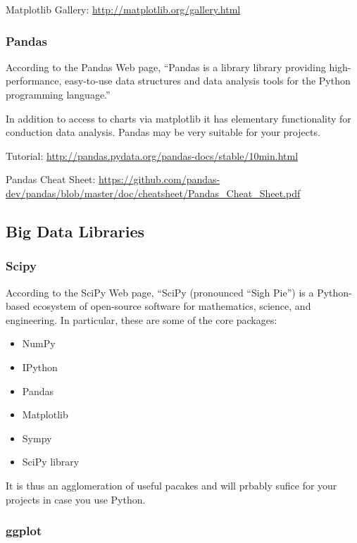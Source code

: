 Matplotlib Gallery: \url{http://matplotlib.org/gallery.html}

\subsubsection{Pandas}\label{pandas}


According to the Pandas Web page, ``Pandas is a library library
providing high-performance, easy-to-use data structures and data
analysis tools for the Python programming language.''

In addition to access to charts via matplotlib it has elementary
functionality for conduction data analysis. Pandas may be very suitable
for your projects.

Tutorial: \url{http://pandas.pydata.org/pandas-docs/stable/10min.html}

Pandas Cheat Sheet:
\url{https://github.com/pandas-dev/pandas/blob/master/doc/cheatsheet/Pandas_Cheat_Sheet.pdf}

\subsection{Big Data Libraries}\label{other-useful-libraries}

\subsubsection{Scipy}\label{scipy}


According to the SciPy Web page, ``SciPy (pronounced ``Sigh Pie'') is a
Python-based ecosystem of open-source software for mathematics, science,
and engineering. In particular, these are some of the core packages:

\begin{itemize}
\item NumPy
\item IPython
\item Pandas
\item Matplotlib
\item Sympy
\item SciPy library
\end{itemize}

It is thus an agglomeration of useful pacakes and will prbably sufice
for your projects in case you use Python.

\subsubsection{ggplot}\label{ggplot}

